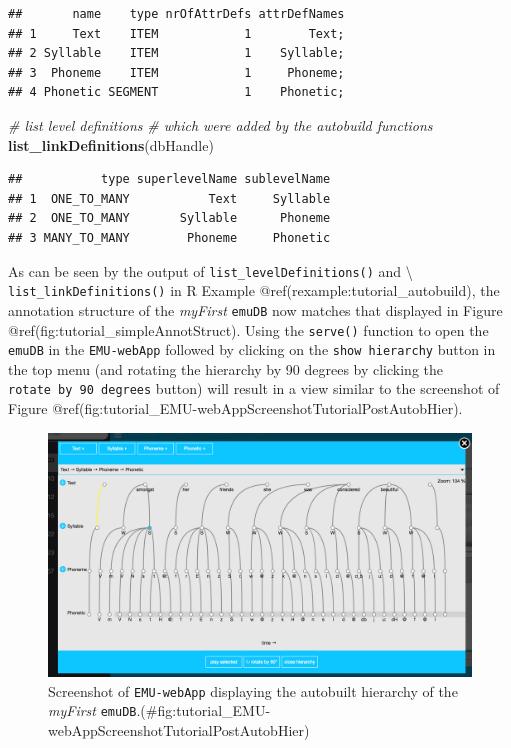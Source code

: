 \documentclass[]{book}
\newenvironment{Shaded}{\begin{snugshade}}{\end{snugshade}}
\newcommand{\KeywordTok}[1]{\textcolor[rgb]{0.13,0.29,0.53}{\textbf{{#1}}}}
\newcommand{\CommentTok}[1]{\textcolor[rgb]{0.56,0.35,0.01}{\textit{{#1}}}}
\newcommand{\NormalTok}[1]{{#1}}
\theoremstyle{definition}
\theoremstyle{definition}
\theoremstyle{definition}
\theoremstyle{remark}
\begin{document}
\begin{verbatim}
##       name    type nrOfAttrDefs attrDefNames
## 1     Text    ITEM            1        Text;
## 2 Syllable    ITEM            1    Syllable;
## 3  Phoneme    ITEM            1     Phoneme;
## 4 Phonetic SEGMENT            1    Phonetic;
\end{verbatim}

\begin{Shaded}
\begin{Highlighting}[]
\CommentTok{# list level definitions}
\CommentTok{# which were added by the autobuild functions}
\KeywordTok{list_linkDefinitions}\NormalTok{(dbHandle)}
\end{Highlighting}
\end{Shaded}

\begin{verbatim}
##           type superlevelName sublevelName
## 1  ONE_TO_MANY           Text     Syllable
## 2  ONE_TO_MANY       Syllable      Phoneme
## 3 MANY_TO_MANY        Phoneme     Phonetic
\end{verbatim}

As can be seen by the output of \texttt{list\_levelDefinitions()} and
\textbackslash{} \texttt{list\_linkDefinitions()} in R Example
@ref(rexample:tutorial\_autobuild), the annotation structure of the
\emph{myFirst} \texttt{emuDB} now matches that displayed in Figure
@ref(fig:tutorial\_simpleAnnotStruct). Using the \texttt{serve()}
function to open the \texttt{emuDB} in the \texttt{EMU-webApp} followed
by clicking on the \texttt{show\ hierarchy} button in the top menu (and
rotating the hierarchy by 90 degrees by clicking the
\texttt{rotate\ by\ 90\ degrees} button) will result in a view similar
to the screenshot of Figure
@ref(fig:tutorial\_EMU-webAppScreenshotTutorialPostAutobHier).

\begin{figure}
\centering
\includegraphics{pics/EMU-webAppScreenshotTutorialPostAutobHier.png}
\caption{Screenshot of \texttt{EMU-webApp} displaying the autobuilt
hierarchy of the \emph{myFirst}
\texttt{emuDB}.(\#fig:tutorial\_EMU-webAppScreenshotTutorialPostAutobHier)}
\end{figure}
\end{document}
